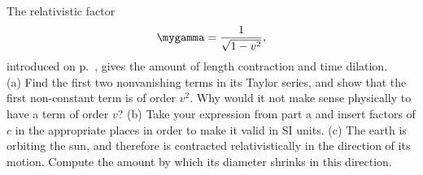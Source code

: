 The relativistic factor
\begin{equation*} 
  \mygamma = \frac{1}{\sqrt{1-v^2}},
\end{equation*} 
introduced on p.~\pageref{gamma-factor-defined}, gives the amount of length contraction and time dilation.\\
(a) Find the first two nonvanishing terms
in its Taylor series, and show that
the first non-constant term is of order $v^2$. Why would it not make sense physically to have
a term of order $v$?\answercheck\hwendpart
(b) Take your expression from part a and
insert factors of $c$ in the appropriate places in order to make it valid in SI units.\answercheck\hwendpart
(c) The earth is orbiting the sun, and therefore is contracted relativistically in the
direction of its motion. Compute the amount by which its diameter shrinks in this
direction.\answercheck\hwendpart
